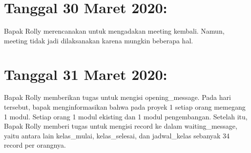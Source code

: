 \documentclass{article}
\begin{document}
\section{Tanggal 30 Maret 2020:}
Bapak Rolly merencanakan untuk mengadakan meeting kembali. Namun, meeting tidak jadi dilaksanakan karena mungkin beberapa hal. 


\section{Tanggal 31 Maret 2020:}
Bapak Rolly memberikan tugas untuk mengisi opening\_message. Pada hari tersebut, bapak menginformasikan bahwa pada proyek 1 setiap orang memegang 1 modul. Setiap orang 1 modul ekisting dan 1 modul pengembangan. Setelah itu, Bapak Rolly memberi tugas untuk mengisi record ke dalam waiting\_message, yaitu antara lain kelas\_mulai, kelas\_selesai, dan jadwal\_kelas sebanyak 34 record per orangnya.
    \newline
    \newline
\end{document}
